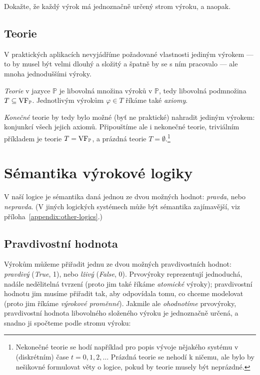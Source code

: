 \begin{exercise}
    Dokažte, že každý výrok má jednoznačně určený strom výroku, a naopak.
\end{exercise}


\subsection{Teorie}

V praktických aplikacích nevyjádříme požadované vlastnosti jediným výrokem --- to by musel být velmi dlouhý a složitý a špatně by se s ním pracovalo --- ale mnoha jednoduššími výroky.

\begin{definition}[Teorie]\label{definition:theory}
    \emph{Teorie} v jazyce $\mathbb P$ je libovolná množina výroků v $\mathbb P$, tedy libovolná podmnožina $T\subseteq\operatorname{VF}_\mathbb P$. Jednotlivým výrokům $\varphi\in T$ říkáme také \emph{axiomy}.
\end{definition}

\emph{Konečné} teorie by tedy bylo možné (byť ne praktické) nahradit jediným výrokem: konjunkcí všech jejich axiomů. Připouštíme ale i nekonečné teorie, triviálním příkladem je teorie $T=\operatorname{VF}_\mathbb P$, a prázdná teorie $T=\emptyset$.\footnote{Nekonečné teorie se hodí například pro popis vývoje nějakého systému v (diskrétním) čase $t=0,1,2,\dots$ Prázdná teorie se nehodí k ničemu, ale bylo by nešikovné formulovat věty o logice, pokud by teorie musely být neprázdné.}


\section{Sémantika výrokové logiky}

V naší logice je sémantika daná jednou ze dvou možných hodnot: \emph{pravda}, nebo \emph{nepravda}. (V jiných logických systémech může být sémantika zajímavější, viz příloha~\ref{appendix:other-logics}.)

\subsection{Pravdivostní hodnota}

Výrokům můžeme přiřadit jednu ze dvou možných pravdivostních hodnot: \emph{pravdivý} (\emph{True}, 1), nebo \emph{lživý} (\emph{False}, 0). Prvovýroky reprezentují jednoduchá, nadále nedělitelná tvrzení (proto jim také říkáme \emph{atomické} výroky); pravdivostní hodnotu jim musíme přiřadit tak, aby odpovídala tomu, co chceme modelovat (proto jim říkáme \emph{výrokové proměnné}). Jakmile ale \emph{ohodnotíme} prvovýroky, pravdivostní hodnota libovolného složeného výroku je jednoznačně určená, a snadno ji spočteme podle stromu výroku:

